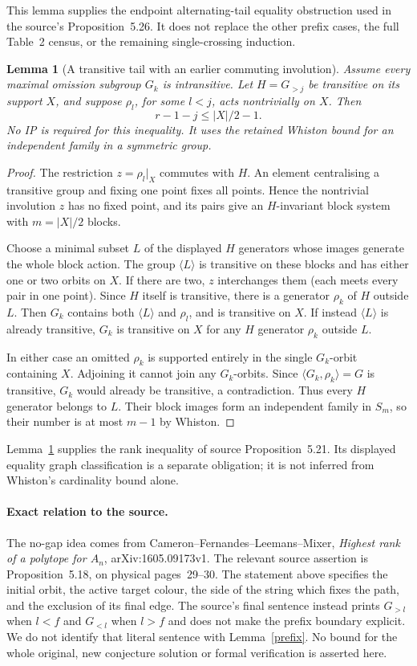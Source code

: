 \documentclass[11pt,a4paper]{article}
\newtheorem{lemma}{Lemma}
\newcommand{\gen}[1]{\langle#1\rangle}
\begin{document}
This lemma supplies the endpoint alternating-tail equality
obstruction used in the source's Proposition~5.26. It does not
replace the other prefix cases, the full Table~2 census, or the
remaining single-crossing induction.


\begin{lemma}[A transitive tail with an earlier commuting involution]
\label{transitivetail}
Assume every maximal omission subgroup $G_k$ is intransitive.
Let $H=G_{>j}$ be transitive on its support $X$, and suppose
$\rho_l$, for some $l<j$, acts nontrivially on $X$. Then
\[
 r-1-j\le |X|/2-1.
\]
No IP is required for this inequality. It uses the retained Whiston
bound for an independent family in a symmetric group.
\end{lemma}
\begin{proof}
The restriction $z=\rho_l|_X$ commutes with $H$. An element
centralising a transitive group and fixing one point fixes all
points. Hence the nontrivial involution $z$ has no fixed point,
and its pairs give an $H$-invariant block system with
$m=|X|/2$ blocks.

Choose a minimal subset $L$ of the displayed $H$ generators whose
images generate the whole block action. The group $\gen{L}$ is
transitive on these blocks and has either one or two orbits on
$X$. If there are two, $z$ interchanges them (each meets every
pair in one point). Since $H$ itself is transitive, there is a
generator $\rho_k$ of $H$ outside $L$. Then $G_k$ contains both
$\gen{L}$ and $\rho_l$, and is transitive on $X$. If instead
$\gen{L}$ is already transitive, $G_k$ is transitive on $X$ for
any $H$ generator $\rho_k$ outside $L$.

In either case an omitted $\rho_k$ is supported entirely in the
single $G_k$-orbit containing $X$. Adjoining it cannot join any
$G_k$-orbits. Since $\gen{G_k,\rho_k}=G$ is transitive, $G_k$
would already be transitive, a contradiction. Thus every $H$
generator belongs to $L$. Their block images form an independent
family in $S_m$, so their number is at most $m-1$ by Whiston.
\end{proof}

Lemma~\ref{transitivetail} supplies the rank inequality of source
Proposition~5.21. Its displayed equality graph classification is
a separate obligation; it is not inferred from Whiston's cardinality
bound alone.

\paragraph{Exact relation to the source.}
The no-gap idea comes from Cameron--Fernandes--Leemans--Mixer,
\emph{Highest rank of a polytope for $A_n$},
arXiv:1605.09173v1. The relevant source assertion is
Proposition~5.18, on physical pages~29--30.
The statement above specifies the initial orbit, the active target
colour, the side of the string which fixes the path, and the
exclusion of its final edge. The source's final sentence instead
prints $G_{>l}$ when $l<f$ and $G_{<l}$ when $l>f$ and does not
make the prefix boundary explicit. We do not identify that literal
sentence with Lemma~\ref{prefix}. No bound for the whole original,
new conjecture solution or formal verification is asserted here.
\end{document}
